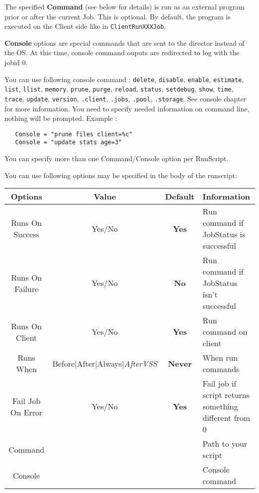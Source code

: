 \begin{description}
The specified {\bf Command} (see below for details) is run as an external
program prior or after the current Job.  This is optional.  By default, the
program is executed on the Client side like in \texttt{ClientRunXXXJob}.

\textbf{Console} options are special commands that are sent to the director instead
of the OS. At this time, console command ouputs are redirected to log with
the jobid 0.

You can use following console command : \texttt{delete}, \texttt{disable},
\texttt{enable}, \texttt{estimate}, \texttt{list}, \texttt{llist},
\texttt{memory}, \texttt{prune}, \texttt{purge}, \texttt{reload},
\texttt{status}, \texttt{setdebug}, \texttt{show}, \texttt{time},
\texttt{trace}, \texttt{update}, \texttt{version}, \texttt{.client},
\texttt{.jobs}, \texttt{.pool}, \texttt{.storage}.  See console chapter for
more information. You need to specify needed information on command line, nothing
will be prompted. Example :

\begin{verbatim}
   Console = "prune files client=%c"
   Console = "update stats age=3"
\end{verbatim}

You can specify more than one Command/Console option per RunScript.

You can use following options may be specified in the body
of the runscript:\\

\begin{tabular}{|c|c|c|l}
\hline
Options         & Value  & Default & Information   \\
\hline
\hline
Runs On Success & Yes/No & {\bf Yes} & Run command if JobStatus is successful\\
\hline
Runs On Failure & Yes/No & {\bf No} & Run command if JobStatus isn't successful\\
\hline
Runs On Client  & Yes/No & {\bf Yes} & Run command on client\\
\hline
Runs When       & Before|After|Always|\textsl{AfterVSS} & {\bf Never} & When run commands\\
\hline
Fail Job On Error & Yes/No & {\bf Yes} & Fail job if script returns
                                          something different from 0 \\
\hline
Command          &       &          & Path to your script\\
\hline
Console          &       &          & Console command\\
\hline
\end{tabular}
   \\


\end{description}
